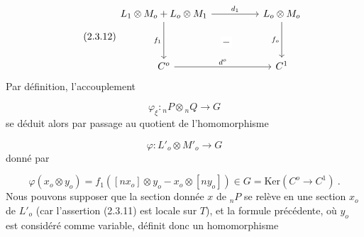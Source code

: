\begin{equation}\tag{2.3.12}
\begin{tikzcd}[column sep=huge, row sep=huge]
L_1\otimes M_o + L_o\otimes M_1 \arrow[r, "d_1"] \arrow[d, "f_1"'] \arrow[rd, phantom, "{-}" description] & L_o\otimes M_o \arrow[d, "f_o"'] \\
C^o \arrow[r, "d^o"] & C^1
\end{tikzcd}
\end{equation}
Par définition, l'accouplement

\begin{equation*}
\varphi_{\xi} : {}_nP \otimes {}_nQ \longrightarrow G
\end{equation*}
se déduit alors par passage au quotient de l'homomorphisme

\begin{equation*}
\varphi : L'_o \otimes M'_o \longrightarrow G
\end{equation*}
donné par

\begin{equation}\tag{2.3.13}
\varphi(x_o \otimes y_o) = f_1([nx_o] \otimes y_o - x_o \otimes [ny_o]) \in G = \mathrm{Ker}(C^o \longrightarrow C^1) \ .
\end{equation}
Nous pouvons supposer que la section donnée $x$ de ${}_nP$ se relève en une section $x_o$ de $L'_o$ (car l'assertion (2.3.11) est locale sur $T$), et la formule précédente, où $y_o$ est considéré comme variable, définit donc un homomorphisme


